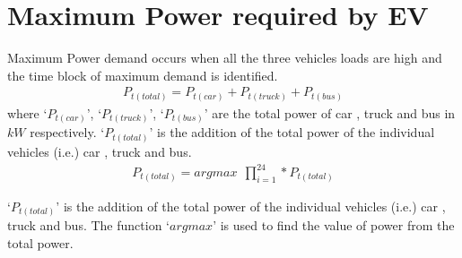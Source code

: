 	\section{Maximum Power required by EV}
	
	
	Maximum Power demand occurs when all the three vehicles loads are high and the time block of maximum demand is identified. 
	\begin{equation}
		\begin{split}
					P_{t(total)} = P_{t(car)} + P_{t(truck)} + P_{t(bus)}
		\end{split}
	\end{equation}	
where `$P_{t(car)}$', `$P_{t(truck)}$', `$P_{t(bus)}$' are the total power of car , truck and bus in $kW$ respectively. `$P_{t(total)}$' is the addition of the total  power of the individual vehicles (i.e.) car , truck and bus.
	\begin{equation}
		\begin{split}
				P_{t(total)} = argmax ~~\prod_{i=1}^{24} \ast P_{t(total)}
		\end{split}
	\end{equation}

`$P_{t(total)}$' is the addition of the total  power of the individual vehicles (i.e.) car , truck and bus. 
The function `$argmax$' is used to find the value of power from the total power. 
	
